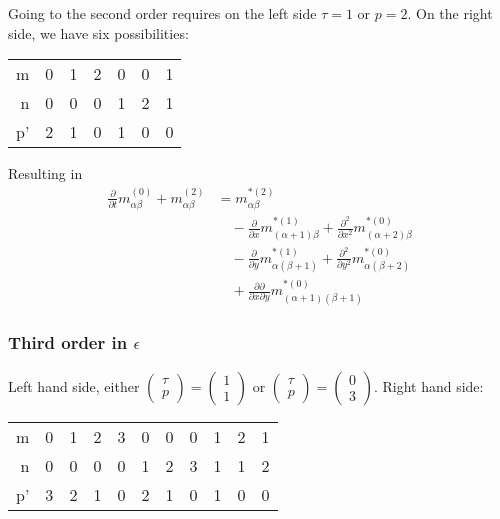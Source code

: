 \documentclass{article}
\begin{document}
Going to the second order requires on the left side $\tau=1$ or $p=2$.
On the right side, we have six possibilities:
\begin{center}
  \begin{tabular} {r || c | *{2}{c} | *{2}{c} | c}
    m  & 0 & 1 & 2 & 0 & 0 & 1 \\
    n  & 0 & 0 & 0 & 1 & 2 & 1 \\
    p' & 2 & 1 & 0 & 1 & 0 & 0
  \end{tabular}
\end{center}
Resulting in
\begin{equation}
  \label{eq:second order in epsilon}
  \begin{aligned}
    \frac{\partial}{\partial t} m_{\alpha\beta}^{(0)} + m_{\alpha\beta}^{(2)}
    & =  m_{\alpha\beta}^{*(2)} \\
    &\quad - \frac{\partial}{\partial x} m_{(\alpha+1)\beta}^{*(1)} + \frac{\partial^2}{\partial x^2} m_{(\alpha+2)\beta}^{*(0)} \\
    &\quad - \frac{\partial}{\partial y} m_{\alpha(\beta+1)}^{*(1)} + \frac{\partial^2}{\partial y^2} m_{\alpha(\beta+2)}^{*(0)} \\
    &\quad + \frac{\partial\partial}{\partial x \partial y} m_{(\alpha+1)(\beta+1)}^{*(0)}
  \end{aligned}
\end{equation}


\subsubsection{Third order in \texorpdfstring{$\epsilon$}{epsilon}}
\label{subs:Third order in epsilon}

Left hand side, either $\begin{pmatrix}\tau \\ p\end{pmatrix} = \begin{pmatrix} 1 \\ 1 \end{pmatrix}$ or $\begin{pmatrix}\tau \\ p\end{pmatrix} = \begin{pmatrix} 0 \\ 3 \end{pmatrix}$.\newline
Right hand side:
\begin{center}
  \begin{tabular} {r || c | *{3}{c} | *{3}{c} | *{3}{c} }
    m  & 0 & 1 & 2 & 3 & 0 & 0 & 0 & 1 & 2 & 1 \\
    n  & 0 & 0 & 0 & 0 & 1 & 2 & 3 & 1 & 1 & 2 \\
    p' & 3 & 2 & 1 & 0 & 2 & 1 & 0 & 1 & 0 & 0
  \end{tabular}
\end{center}
\end{document}
